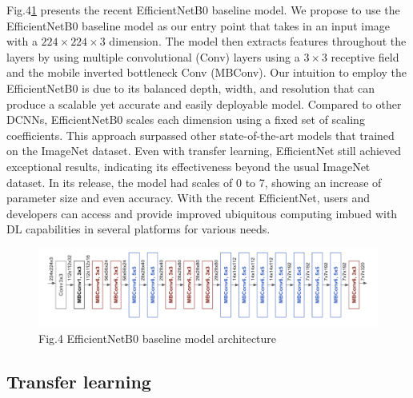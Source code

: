 \documentclass[12pt]{article}
\begin{document}
 Fig.4\ref{fig:effNet} presents the recent EfficientNetB0 baseline model. We propose to use the
EfficientNetB0 baseline model as our entry point that takes in an input image with a
$224 \times 224 \times 3$ dimension. The model then extracts features throughout the layers by using
multiple convolutional (Conv) layers using a $3 \times 3$ receptive field and the mobile inverted
bottleneck Conv (MBConv). Our intuition to employ the EfficientNetB0 is due to its balanced
depth, width, and resolution that can produce a scalable yet accurate and easily deployable
model. Compared to other DCNNs, EfficientNetB0 scales each dimension using a fixed set of
scaling coefficients. This approach surpassed other state-of-the-art models that trained on the
ImageNet dataset. Even with transfer learning, EfficientNet still achieved exceptional results,
indicating its effectiveness beyond the usual ImageNet dataset. In its release, the model had
scales of 0 to 7, showing an increase of parameter size and even accuracy. With the recent
EfficientNet, users and developers can access and provide improved ubiquitous computing
imbued with DL capabilities in several platforms for various needs.

\begin{center}
\begin{figure}[H]
\includegraphics[width=1\textwidth]{Figs/effNet}
\caption{Fig.4 EfficientNetB0 baseline model architecture}
\label{fig:effNet}
\end{figure}
\end{center}
	
	\subsection{Transfer learning}
	
\end{document}
